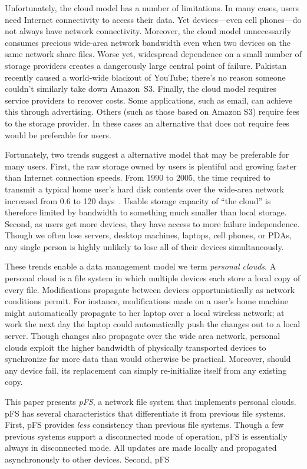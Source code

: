 Unfortunately, the cloud model has a number of limitations.  In many
cases, users need Internet connectivity to access their data.  Yet
devices---even cell phones---do not always have network connectivity.
Moreover, the cloud model unnecessarily consumes precious wide-area
network bandwidth even when two devices on the same network share
files.  Worse yet, widespread dependence on a small number of storage
providers creates a dangerously large central point of failure.
Pakistan recently caused a world-wide blackout of YouTube; there's no
reason someone couldn't similarly take down Amazon~S3.  Finally, the
cloud model requires service providers to recover costs.  Some
applications, such as email, can achieve this through advertising.
Others (such as those based on Amazon S3) require fees to the storage
provider.  In these cases an alternative that does not require fees
would be preferable for users.

Fortunately, two trends suggest a alternative model that may be
preferable for many users.  First, the raw storage owned by users is
plentiful and growing faster than Internet connection speeds.  From
1990 to 2005, the time required to transmit a typical home user's hard
disk contents over the wide-area network increased from 0.6 to 120
days~\cite{rodrigues:multi-hop}.  Usable storage capacity of ``the
cloud'' is therefore limited by bandwidth to something much smaller
than local storage.  Second, as users get more devices, they have
access to more failure independence.  Though we often lose servers,
desktop machines, laptops, cell phones, or PDAs, any single person is
highly unlikely to lose all of their devices simultaneously.

These trends enable a data management model we term \emph{personal
  clouds}.  A personal cloud is a file system in which multiple
devices each store a local copy of every file.  Modifications
propagate between devices opportunistically as network conditions
permit.  For instance, modifications made on a user's home machine
might automatically propagate to her laptop over a local wireless
network; at work the next day the laptop could automatically push the
changes out to a local server.  Though changes also propagate over the
wide area network, personal clouds exploit the higher bandwidth of
physically transported devices to synchronize far more data than would
otherwise be practical.  Moreover, should any device fail, its
replacement can simply re-initialize itself from any existing copy.

This paper presents \emph{pFS}, a network file system that implements
personal clouds.  pFS has several characteristics that differentiate
it from previous file systems.  First, pFS provides \emph{less}
consistency than previous file systems.  Though a few previous systems
support a disconnected mode of operation, pFS is essentially always in
disconnected mode.  All updates are made locally and propagated
asynchronously to other devices.  Second, pFS 

